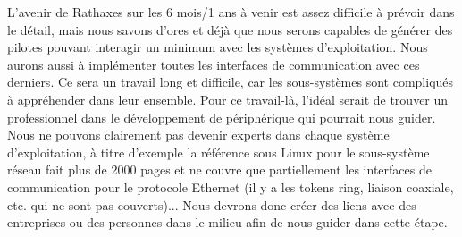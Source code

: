 \documentclass[francais]{rtxreport}
\begin{document}
L’avenir de Rathaxes sur les 6 mois/1 ans à venir est assez difficile à prévoir
dans le détail, mais nous savons d’ores et déjà que nous serons capables de
générer des pilotes pouvant interagir un minimum avec les systèmes
d’exploitation. Nous aurons aussi à implémenter toutes les interfaces de
communication avec ces derniers. Ce sera un travail long et difficile, car les
sous-systèmes sont compliqués à appréhender dans leur ensemble. Pour ce
travail-là, l’idéal serait de trouver un professionnel dans le développement de
périphérique qui pourrait nous guider. Nous ne pouvons clairement pas devenir
experts dans chaque système d’exploitation, à titre d’exemple la référence sous
Linux pour le sous-système réseau fait plus de 2000 pages et ne couvre que
partiellement les interfaces de communication pour le protocole Ethernet (il y
a les tokens ring, liaison coaxiale, etc. qui ne sont pas couverts)...  Nous
devrons donc créer des liens avec des entreprises ou des personnes dans le
milieu afin de nous guider dans cette étape.
\end{document}
